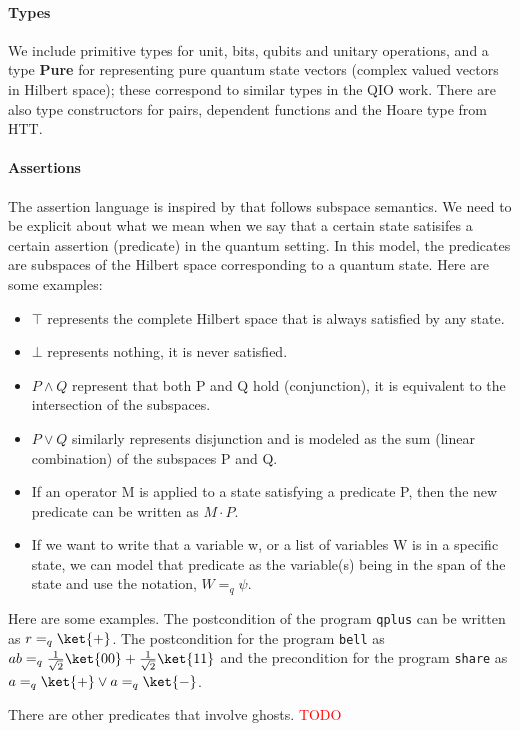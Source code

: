 \documentclass[acmsmall,nonacm,timestamp,review=false,anonymous=false]{acmart}
\newcommand{\type}[1]{\textrm{\textbf{#1}}}
\newcommand{\todo}[1]{\textcolor{red}{#1}}
\begin{document}
\paragraph{Types} We include primitive types for unit, bits, qubits and unitary operations, and a type \type{Pure} for representing pure quantum state vectors (complex valued vectors in Hilbert space); these correspond to similar types in the QIO work. There are also type constructors for pairs, dependent functions and the Hoare type from HTT.

\paragraph{Assertions}
The assertion language is inspired by \citet{unruh2019} that follows subspace semantics. We need to be explicit about what we mean when we say that a certain state satisifes a certain assertion (predicate) in the quantum setting. In this model, the predicates are subspaces of the Hilbert space corresponding to a quantum state. Here are some examples:
\begin{itemize}
	\item $\top$ represents the complete Hilbert space that is always satisfied by any state.
	\item $\bot$ represents nothing, it is never satisfied.
	\item $P \wedge Q$ represent that both P and Q hold (conjunction), it is equivalent to the intersection of the subspaces.
	\item $P \vee Q$ similarly represents disjunction and is modeled as the sum (linear combination) of the subspaces P and Q.
	\item If an operator M is applied to a state satisfying a predicate P, then the new predicate can be written as $M \cdot P$.
	\item If we want to write that a variable w, or a list of variables W is in a specific state, we can model that predicate as the variable(s) being in the span of the state and use the notation, $W =_q \psi$.
\end{itemize}

Here are some examples. The postcondition of the program \texttt{qplus} can be written as $r =_q \ket{+}$. The postcondition for the program \texttt{bell} as $ab =_q \frac{1}{\sqrt{2}}\ket{00}+\frac{1}{\sqrt{2}}\ket{11}$ and the precondition for the program \texttt{share} as $a =_q \ket{+} \vee a =_q \ket{-}$.

There are other predicates that involve ghosts. \todo{TODO}
\end{document}
